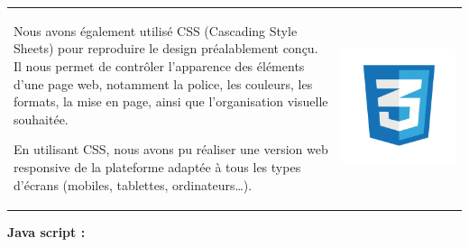 \documentclass{article}
\begin{document}
\noindent
\begin{tabular}
{@{}m{}@{\hspace{1em}}m{}@{}}
Nous avons également utilisé CSS (Cascading Style Sheets) pour reproduire le design préalablement conçu. Il nous permet de contrôler l’apparence des éléments d’une page web, notamment la police, les couleurs, les formats, la mise en page, ainsi que l’organisation visuelle souhaitée.


En utilisant CSS, nous avons pu réaliser une version web responsive de la plateforme adaptée à tous les types d'écrans (mobiles, tablettes, ordinateurs…).
&
\includegraphics[width=\linewidth]{css.png} %
\end{tabular}


\vspace{0,3cm}


\noindent \normalsize \textbf{Java script :}

\vspace{0,1cm}
\end{document}
